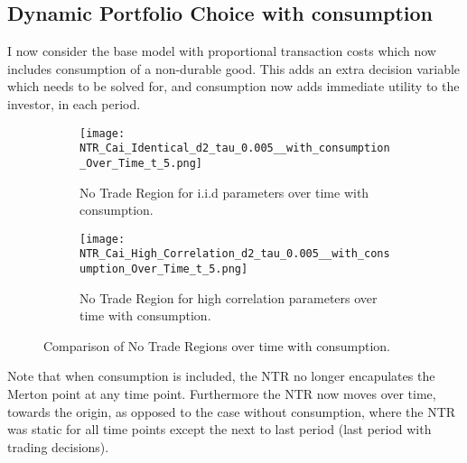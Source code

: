 \documentclass[11pt]{article}
\begin{document}
\subsection{Dynamic Portfolio Choice with consumption} \label{Subsection: Results_WithConsumption}
I now consider the base model with proportional transaction costs which now includes consumption of a non-durable good.
This adds an extra decision variable which needs to be solved for, and consumption now adds immediate utility to the investor, in each period.
\begin{figure}[!ht]
    \centering
    \begin{subfigure}[t]{0.48\textwidth}
        \centering
        \texttt{[image: NTR\_Cai\_Identical\_d2\_tau\_0.005\_\_with\_consumption\_Over\_Time\_t\_5.png]}
        \caption{No Trade Region for i.i.d parameters over time with consumption.}
        \label{fig:NTR_2d_iid_with_consumption_over_time}
    \end{subfigure}%
    \hfill
    \begin{subfigure}[t]{0.48\textwidth}
        \centering
        \texttt{[image: NTR\_Cai\_High\_Correlation\_d2\_tau\_0.005\_\_with\_consumption\_Over\_Time\_t\_5.png]}
        \caption{No Trade Region for high correlation parameters over time with consumption.}
        \label{fig:NTR_2d_high_correlation_with_consumption_over_time}
    \end{subfigure}
    \caption{Comparison of No Trade Regions over time with consumption.}
\end{figure}

Note that when consumption is included, the \ac{NTR} no longer encapulates the Merton point at any time point.
Furthermore the \ac{NTR} now moves over time, towards the origin, as opposed to the case without consumption,
where the \ac{NTR} was static for all time points except the next to last period (last period with trading decisions).

\ifdefined\COMPILINGMAIN
\else
\end{document}
